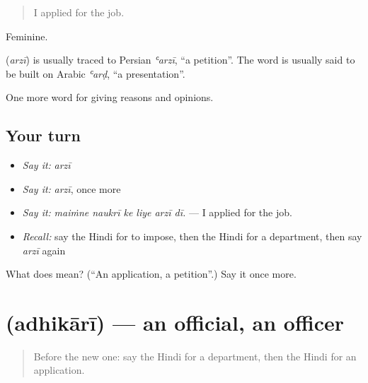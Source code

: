 \begin{quote}
I applied for the job.
\end{quote}

Feminine.

\begin{cousinweb}
\textbf{} (\emph{arzī}) is usually traced to Persian \emph{ʿarzī}, \textquotedblleft{}a petition\textquotedblright{}. The word is usually said to be built on Arabic \emph{ʿarḍ}, \textquotedblleft{}a presentation\textquotedblright{}.
\end{cousinweb}

\begin{grammarlens}[title={What you've built}]
One more word for giving reasons and opinions.
\end{grammarlens}

\subsection*{Your turn}
\begin{itemize}
\raggedright
  \item \emph{Say it:} \emph{arzī}
  \item \emph{Say it:} \emph{arzī}, once more
  \item \emph{Say it:} \emph{maiṁne naukrī ke liye arzī dī.} — I applied for the job.
  \item \emph{Recall:} say the Hindi for to impose, then the Hindi for a department, then say \emph{arzī} again
\end{itemize}

\begin{tcolorbox}[breakable,colback=teal!4,colframe=teal!35!black,title={Before you move on}]
What does  mean? (\textquotedblleft{}An application, a petition\textquotedblright{}.) Say it once more.
\end{tcolorbox}
\section[\texorpdfstring{\hi{अधिकारी} (adhikārī)}{अधिकारी (adhikārī)}]{ (adhikārī) — an official, an officer}

\label{lesson:HI-C355-adhikari}



\begin{quote}
Before the new one: say the Hindi for a department, then the Hindi for an application.
\end{quote}

